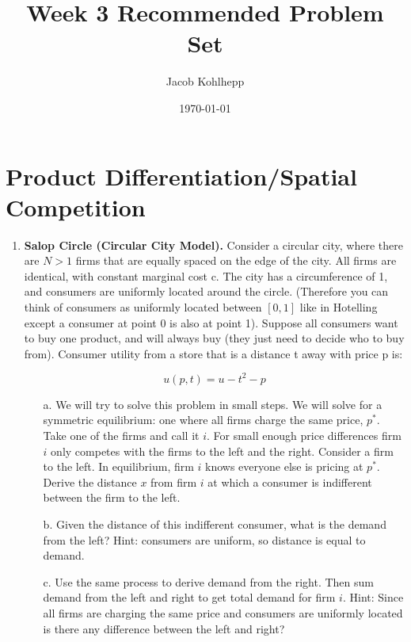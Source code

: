 \documentclass{article}
\begin{document}
\title{Week 3 Recommended Problem Set}
\author{Jacob Kohlhepp}
\date{\today}

\maketitle

\section{Product Differentiation/Spatial Competition}

\begin{enumerate}
    \item \textbf{Salop Circle (Circular City Model).} Consider a circular city, where there are $N > 1$ firms that are equally spaced on the edge of the city. All firms are identical, with constant marginal cost c. The city has a circumference of 1, and consumers are uniformly located around the circle. (Therefore you can think of consumers as uniformly located between $[0, 1]$ like in Hotelling except a consumer at point 0 is also at point 1). Suppose all consumers want to buy one product, and will always buy (they just need to decide who to buy from). Consumer utility from a store that is a distance t away with price p is:

    \[u(p,t) = u-t^2 -p\]
    \begin{enumerate}
        \item[a.] We will try to solve this problem in small steps. We will solve for a symmetric equilibrium: one where all firms charge the same price, $p^*$. Take one of the firms and call it $i$. For small enough price differences firm $i$ only competes with the firms to the left and the right. Consider a firm to the left. In equilibrium, firm $i$ knows everyone else is pricing at $p^*$. Derive the distance $x$ from firm $i$ at which a consumer is indifferent between the firm to the left.
        
        \vspace{6cm}
        
        \item[b.] Given the distance of this indifferent consumer, what is the demand from the left? Hint: consumers are uniform, so distance is equal to demand.
        
        \vspace{2cm}
        
        \item[c.] Use the same process to derive demand from the right. Then sum demand from the left and right to get total demand for firm $i$. Hint: Since all firms are charging the same price and consumers are uniformly located is there any difference between the left and right?
        

\end{enumerate}
\end{enumerate}
\end{document}
